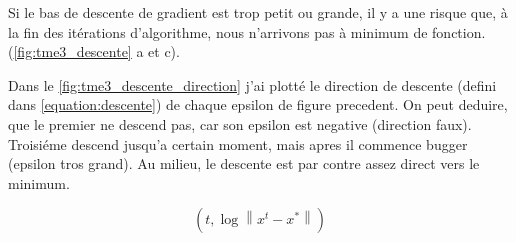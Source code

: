\documentclass[a4paper,12pt]{article}
\begin{document}
Si le bas de descente de gradient est trop petit ou grande, 
il y a une risque que, à la fin des itérations d'algorithme, nous n'arrivons pas à minimum de fonction.
(\autoref{fig:tme3_descente} a et c).

Dans le \autoref{fig:tme3_descente_direction} j'ai plotté le direction de descente (defini dans \autoref{equation:descente}) de chaque epsilon de figure
precedent. On peut deduire, que le premier ne descend pas, car son epsilon est negative (direction faux).
Troisiéme descend jusqu'a certain moment, mais apres il commence bugger (epsilon tros grand).
Au milieu, le descente est par contre assez direct vers le minimum.

\begin{equation}
\label{equation:descente}
	\left ( t, \log \left \| x^{t} - x^{*} \right  \| \right )
\end{equation}
\end{document}
